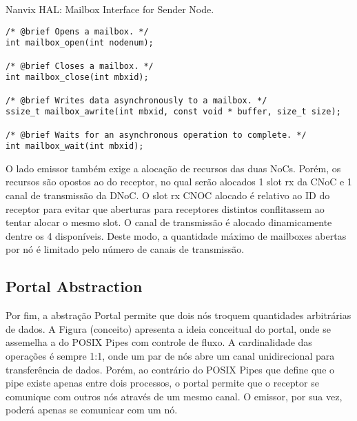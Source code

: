 
\begin{listing}[!tb]
\caption{Nanvix HAL: Mailbox Interface for Sender Node.}
\label{code:hal-mailbox-sender}
\begin{verbatim}
/* @brief Opens a mailbox. */
int mailbox_open(int nodenum);

/* @brief Closes a mailbox. */
int mailbox_close(int mbxid);

/* @brief Writes data asynchronously to a mailbox. */
ssize_t mailbox_awrite(int mbxid, const void * buffer, size_t size);

/* @brief Waits for an asynchronous operation to complete. */
int mailbox_wait(int mbxid);
\end{verbatim}
\end{listing}

				O lado emissor também exige a alocação de recursos das duas NoCs.
				Porém, os recursos são opostos ao do receptor, no qual serão alocados 1 slot rx da CNoC e 1 canal de transmissão da DNoC.
				O slot rx CNOC alocado é relativo ao ID do receptor para evitar que aberturas para receptores distintos conflitassem ao tentar alocar o mesmo slot.
				O canal de transmissão é alocado dinamicamente dentre os 4 disponíveis.
				Deste modo, a quantidade máximo de mailboxes abertas por nó é limitado pelo número de canais de transmissão.

		\subsection{Portal Abstraction}
		\label{sec.portal-abs}


			Por fim, a abstração Portal permite que dois nós troquem quantidades arbitrárias de dados.
			A Figura (conceito) apresenta a ideia conceitual do portal, onde se assemelha a do POSIX Pipes com controle de fluxo.
			A cardinalidade das operações é sempre 1:1, onde um par de nós abre um canal unidirecional para transferência de dados.
			Porém, ao contrário do POSIX Pipes que define que o pipe existe apenas entre dois processos, o portal permite que o receptor se comunique com outros nós através de um mesmo canal.
			O emissor, por sua vez, poderá apenas se comunicar com um nó.

